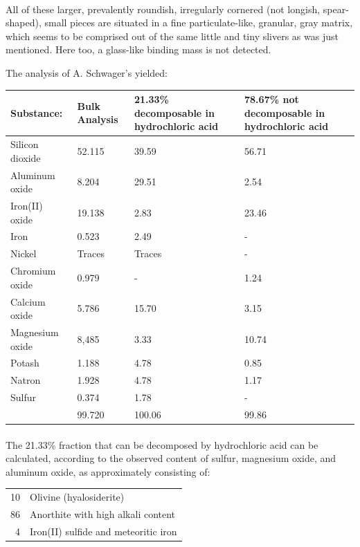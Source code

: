 \documentclass[a4paper, 12pt, oneside]{article}
\begin{document}
\paragraph*{}
All of these larger, prevalently roundish, irregularly cornered (not longish, spear-shaped), small pieces are situated in a fine particulate-like, granular, gray matrix, which seems to be comprised out of the same little and tiny slivers as was just mentioned. Here too, a glass-like binding mass is not detected.

The analysis of A. Schwager's yielded:
\begin{center}
    \tiny
    \begin{tabular}{|l|p{1.75cm}|p{1.5cm}|p{1.5cm}|}
        \hline
        Substance: & Bulk Analysis & 21.33\% decomposable in hydrochloric acid & 78.67\% not decomposable in hydrochloric acid\\\hline
        Silicon dioxide & 52.115 & 39.59 & 56.71\\\hline
        Aluminum oxide & 8.204 & 29.51 & 2.54\\\hline
        Iron(II) oxide & 19.138 & 2.83 & 23.46\\\hline
        Iron & 0.523 & 2.49 & -\\\hline
        Nickel & Traces & Traces & -\\\hline
        Chromium oxide & 0.979 & - & 1.24\\\hline
        Calcium oxide & 5.786 & 15.70 & 3.15\\\hline
        Magnesium oxide & 8,485 & 3.33 & 10.74\\\hline
        Potash & 1.188 & 4.78 & 0.85\\\hline
        Natron & 1.928 & 4.78 & 1.17\\\hline
        Sulfur & 0.374 & 1.78 & -\\\hline
        & 99.720 & 100.06 & 99.86\\
        \hline
    \end{tabular}
\end{center}
\paragraph*{}
The 21.33\% fraction that can be decomposed by hydrochloric acid can be calculated, according to the observed content of sulfur, magnesium oxide, and aluminum oxide, as approximately consisting of:
\begin{center}
    \begin{tabular}{r l}
        10 & Olivine (hyalosiderite)\\
        86 & Anorthite with high alkali content\\
        4 & Iron(II) sulfide and meteoritic iron\\
    \end{tabular}
\end{center}
\end{document}
